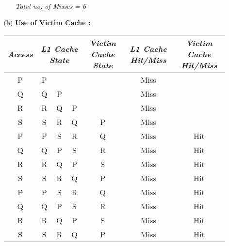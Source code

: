\documentclass[letterpaper]{article}
\begin{document}
\begin{large}
\begin{flushleft}
\begin{enumerate}
\begin{enumerate}
\begin{enumerate}
\begin{table}[h]
\begin{tabular}{|c|c|}
\hline
\end{tabular}
\end{table}
\begin{center}
\textit{Total no. of Misses = 6\\[0.2in] }
\end{center}
\end{enumerate}
\item[(b)]
\textbf{Use of Victim Cache :}\\[0.1in]
\begin{table}[ht]
\centering
\begin{tabular}{|c|ccc|c|c|c|}
\hline
\textit{\textbf{ Access}} & \multicolumn{3}{c|}{\textbf{\textit{L1 Cache State}}} & \textbf{\textit{Victim Cache State}} &\textit{ \textbf{L1 Cache Hit/Miss}} &\textbf{\textit{Victim Cache Hit/Miss}}\\
\hline
P& P&&&&Miss&\\
\hline
Q& Q&\quad P&&&Miss&\\
\hline
R& R&\quad Q&\quad P&&Miss&\\
\hline
S& S&\quad R&\quad Q&P&Miss&\\
\hline
P& P&\quad S&\quad R&Q&Miss&Hit\\
\hline
Q& Q&\quad P&\quad S&R&Miss&Hit\\
\hline
R& R&\quad Q&\quad P&S&Miss&Hit\\
\hline
S& S&\quad R&\quad Q&P&Miss&Hit\\
\hline
P& P&\quad S&\quad R&Q&Miss&Hit\\
\hline
Q& Q&\quad P&\quad S&R&Miss&Hit\\
\hline
R& R&\quad Q&\quad P&S&Miss&Hit\\
\hline
S& S&\quad R&\quad Q&P&Miss&Hit\\
\hline
\end{tabular}
\end{table}
\end{enumerate}


\end{enumerate}
\end{flushleft}
\end{large}
\end{document}
